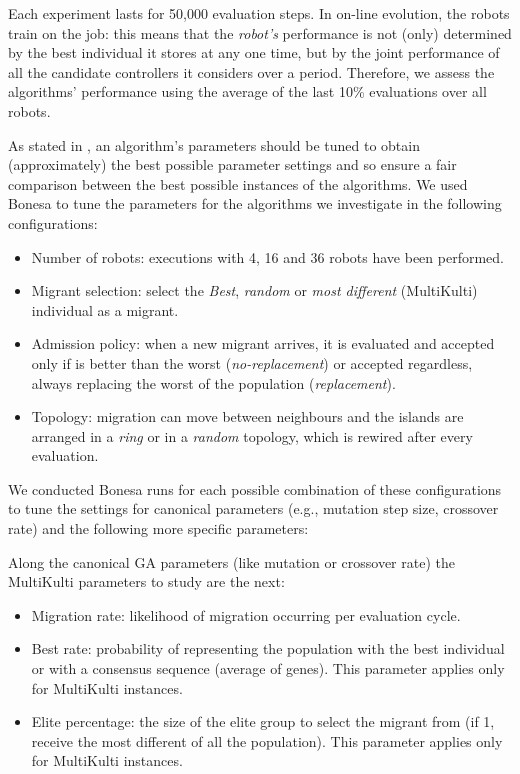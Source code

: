 \documentclass[runningheads]{llncs}
\begin{document}
Each experiment lasts for 50,000 evaluation steps. 
In on-line evolution, the robots train on the job: this means that the {\em robot's} performance is not (only) determined by the best individual it stores at any one time, but by the joint performance of all the candidate controllers it considers over a period. Therefore, we assess the algorithms' performance using the average of the last 10\% evaluations over all robots.


As stated in \cite{PARAMETERTUNING}, an algorithm's parameters should be tuned to obtain (approximately) the best possible parameter settings and so ensure a fair comparison between the best possible instances of the algorithms.
We used Bonesa \cite{BONESA} to tune the parameters for the algorithms we investigate in the following configurations:
\begin{itemize}
\item Number of robots: executions with 4, 16 and 36 robots have been performed.
\item Migrant selection: select the {\em Best}, {\em random } or {\em most different} (MultiKulti) individual as a migrant. 
\item Admission policy: when a new migrant arrives, it is evaluated and accepted only if is better than the worst ({\em no-replacement}) or accepted regardless, always replacing the worst of the population ({\em replacement}).
\item Topology: migration can move between neighbours and the islands are arranged in a {\em ring} or in a {\em random} topology, which is rewired after every evaluation.
\end{itemize}

We conducted Bonesa runs for each possible combination of these configurations to tune the settings for canonical parameters (e.g., mutation step size, crossover rate) and the following more specific parameters:

Along the canonical GA parameters (like mutation or crossover rate) the MultiKulti parameters to study are the next:
\begin{itemize}
\item Migration rate: likelihood of migration occurring per evaluation cycle.
\item Best rate: probability of representing the population with the best individual or with a consensus sequence (average of genes). This parameter applies only for MultiKulti instances.
\item Elite percentage: the size of the elite group to select the migrant from (if 1, receive the most different of all the population). This parameter applies only for MultiKulti instances.
\end{itemize}
\end{document}
